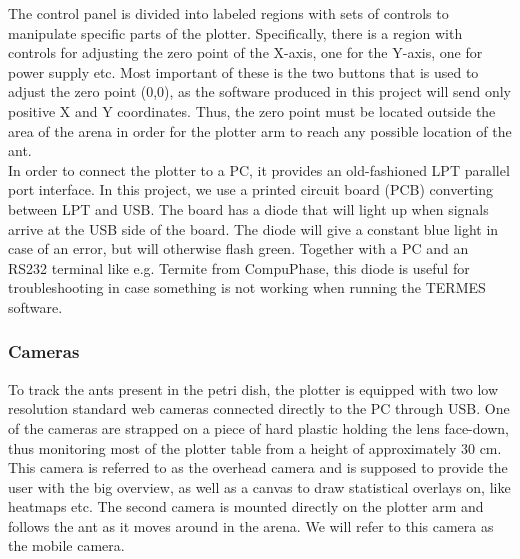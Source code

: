 The control panel is divided into labeled regions with sets of controls to manipulate specific parts of the plotter. Specifically, there is a region with controls for adjusting the zero point of the X-axis, one for the Y-axis, one for power supply etc. Most important of these is the two buttons that is used to adjust the zero point (0,0), as the software produced in this project will send only positive X and Y coordinates. Thus, the zero point must be located outside the area of the arena in order for the plotter arm to reach any possible location of the ant. \\

In order to connect the plotter to a PC, it provides an old-fashioned LPT parallel port interface. In this project, we use a printed circuit board (PCB) converting between LPT and USB. The board has a diode that will light up when signals arrive at the USB side of the board. The diode will give a constant blue light in case of an error, but will otherwise flash green. Together with a PC and an RS232 terminal like e.g. Termite from CompuPhase, this diode is useful for troubleshooting in case something is not working when running the TERMES software. 

%

\subsubsection{Cameras}
To track the ants present in the petri dish, the plotter is equipped with two low resolution standard web cameras connected directly to the PC through USB. One of the cameras are strapped on a piece of hard plastic holding the lens face-down, thus monitoring most of the plotter table from a height of approximately 30 cm. This camera is referred to as the overhead camera and is supposed to provide the user with the big overview, as well as a canvas to draw statistical overlays on, like heatmaps etc. The second camera is mounted directly on the plotter arm and follows the ant as it moves around in the arena. We will refer to this camera as the mobile camera. \\

